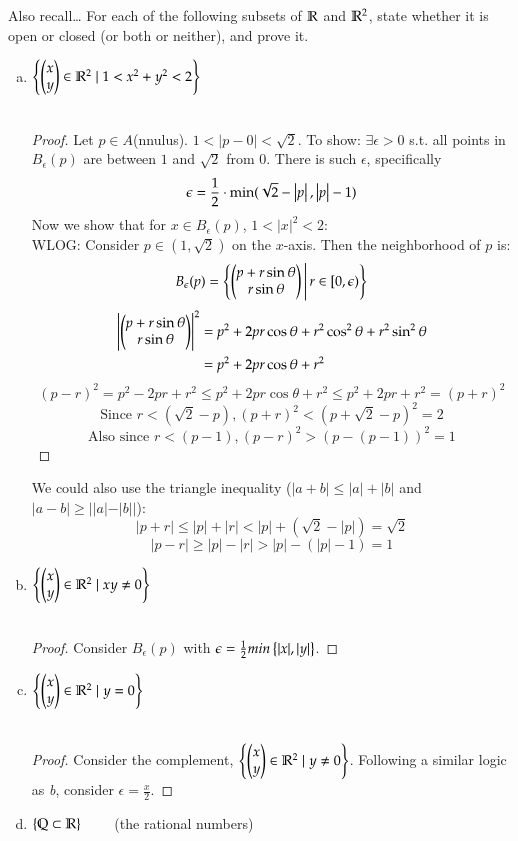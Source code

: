 Also recall\dots
{}
For each of the following subsets of $\mathbb{R}$ and $\mathbb{R}^2$, state whether it is open or closed (or both or neither), and prove it.
\begin{enumerate}[a.]
	\item $\left\{ \begin{pmatrix} x \\ y \end{pmatrix} \in \mathbb{R}^2 \mid 1 < x^2+y^2 < 2 \right\}$ \\
   \\
  \begin{proof}
		Let $p\in A$(nnulus). $1 < |p-0| < \sqrt{2}$. To show: $\exists \epsilon > 0$ s.t. all points in $B_\epsilon (p)$ are between $1$ and $\sqrt{2}$ from 0. There is such $\epsilon$, specifically
		\[\epsilon = \frac{1}{2}\cdot \mathrm{min}(\sqrt{2}-\left|p\right|, \left|p\right| - 1)\]
    Now we show that for $x\in B_\epsilon (p)$, $1 < |x|^2 < 2$: \\
    WLOG: Consider $p\in (1,\sqrt{2})$ on the $x$-axis. Then the neighborhood of $p$ is:
    \[B_\epsilon (p) = \left\{ \begin{pmatrix} p+r \sin{\theta} \\ r \sin{\theta} \end{pmatrix} \,\middle\vert\, r\in [0,\epsilon) \right\}\]
    \begin{align*}
      \left| \begin{pmatrix} p+r \sin{\theta} \\ r \sin{\theta} \end{pmatrix} \right|^2 & = p^2 + 2pr \cos{\theta} + r^2\cos^2 \theta + r^2 \sin^2 \theta \\
      &= p^2 + 2pr \cos{\theta} + r^2
    \end{align*}
    \[(p-r)^2 = p^2 - 2pr + r^2 \leq p^2 + 2pr \cos{\theta} + r^2 \leq p^2 + 2pr+r^2 = (p+r)^2\]
    \[\text{Since }r  < (\sqrt{2}-p), (p+r)^2 < (p+\sqrt{2}-p)^2 = 2\]
    \[\text{Also since } r < (p-1), (p-r)^2 > \left(p-(p-1)\right)^2 = 1\]
	\end{proof}

We could also use the triangle inequality ($|a+b| \leq |a| + |b|$ and $|a-b|\geq ||a|-|b||$):
\[|p+r| \leq |p| + |r| < |p| + (\sqrt{2} - |p|) = \sqrt{2}\]
\[|p-r| \geq |p| - |r| > |p| - (|p| - 1) = 1\]

	\item $\left\{ \begin{pmatrix} x \\ y \end{pmatrix} \in \mathbb{R}^2 \mid xy\neq 0 \right\}$ \\
   \\
	\begin{proof}
    Consider $B_\epsilon (p)$ with $\epsilon = \frac{1}{2} min\left\{ |x|, |y| \right\}$.
	\end{proof}
	\item $\left\{ \begin{pmatrix} x \\ y \end{pmatrix} \in \mathbb{R}^2 \mid y=0 \right\}$ \\
   \\
  \begin{proof} Consider the complement, $\left\{ \begin{pmatrix} x \\ y \end{pmatrix} \in \mathbb{R}^2 \mid y\neq 0 \right\}$. Following a similar logic as \textit{b}, consider $\epsilon = \frac{x}{2}$.  \end{proof}
	\item $\left\{ \mathbb{Q} \subset \mathbb{R} \right\}\qquad$ (the rational numbers) \\
\end{enumerate}

